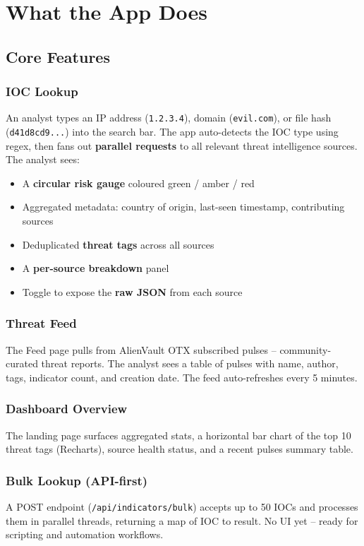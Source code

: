 \documentclass[11pt,a4paper]{article}
\begin{document}
\section{What the App Does}

\subsection{Core Features}

\subsubsection{IOC Lookup}
An analyst types an IP address (\texttt{1.2.3.4}), domain (\texttt{evil.com}), or file hash (\texttt{d41d8cd9...}) into the search bar. The app auto-detects the IOC type using regex, then fans out \textbf{parallel requests} to all relevant threat intelligence sources. The analyst sees:

\begin{itemize}
  \item A \textbf{circular risk gauge} coloured green / amber / red
  \item Aggregated metadata: country of origin, last-seen timestamp, contributing sources
  \item Deduplicated \textbf{threat tags} across all sources
  \item A \textbf{per-source breakdown} panel
  \item Toggle to expose the \textbf{raw JSON} from each source
\end{itemize}

\subsubsection{Threat Feed}
The Feed page pulls from AlienVault OTX subscribed pulses -- community-curated threat reports. The analyst sees a table of pulses with name, author, tags, indicator count, and creation date. The feed auto-refreshes every 5 minutes.

\subsubsection{Dashboard Overview}
The landing page surfaces aggregated stats, a horizontal bar chart of the top 10 threat tags (Recharts), source health status, and a recent pulses summary table.

\subsubsection{Bulk Lookup (API-first)}
A POST endpoint (\texttt{/api/indicators/bulk}) accepts up to 50 IOCs and processes them in parallel threads, returning a map of IOC to result. No UI yet -- ready for scripting and automation workflows.
\end{document}
